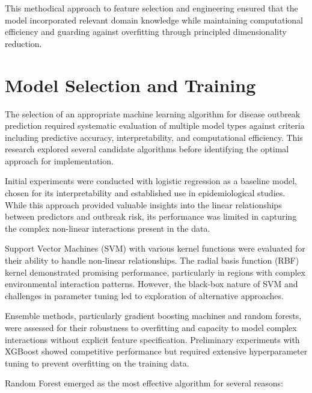 \documentclass[12pt,a4paper]{report}
\begin{document}
This methodical approach to feature selection and engineering ensured that the model incorporated relevant domain knowledge while maintaining computational efficiency and guarding against overfitting through principled dimensionality reduction.

\section{Model Selection and Training}
The selection of an appropriate machine learning algorithm for disease outbreak prediction required systematic evaluation of multiple model types against criteria including predictive accuracy, interpretability, and computational efficiency. This research explored several candidate algorithms before identifying the optimal approach for implementation.

Initial experiments were conducted with logistic regression as a baseline model, chosen for its interpretability and established use in epidemiological studies. While this approach provided valuable insights into the linear relationships between predictors and outbreak risk, its performance was limited in capturing the complex non-linear interactions present in the data.

Support Vector Machines (SVM) with various kernel functions were evaluated for their ability to handle non-linear relationships. The radial basis function (RBF) kernel demonstrated promising performance, particularly in regions with complex environmental interaction patterns. However, the black-box nature of SVM and challenges in parameter tuning led to exploration of alternative approaches.

Ensemble methods, particularly gradient boosting machines and random forests, were assessed for their robustness to overfitting and capacity to model complex interactions without explicit feature specification. Preliminary experiments with XGBoost showed competitive performance but required extensive hyperparameter tuning to prevent overfitting on the training data.

Random Forest emerged as the most effective algorithm for several reasons:
\end{document}
